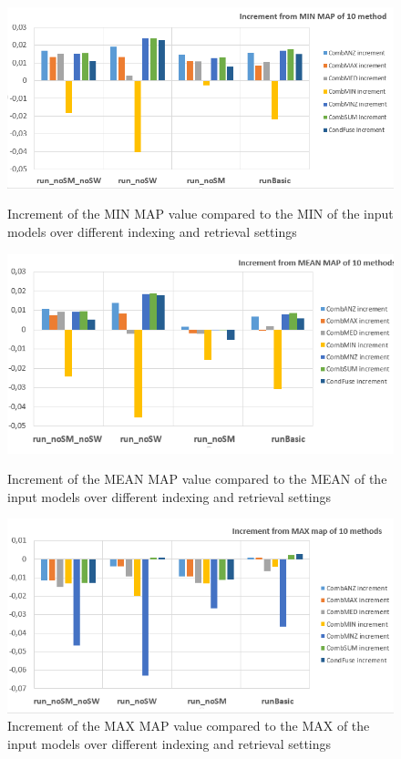 {	\begin{figure}	
		\begin{minipage}[H]{0.5\linewidth}
			\centering
			\includegraphics[width=\linewidth]{../eval/results-img-graphs/incrementFromMIN.png}
			\caption{Increment of the MIN MAP value compared to the MIN of the input models over different indexing and retrieval settings}				
			\label{fig:MINincr}
		\end{minipage}
		\begin{minipage}[H]{0.5\linewidth}
			\centering
			\includegraphics[width=\linewidth]{../eval/results-img-graphs/incrementFromMEAN.png}
			\caption{Increment of the MEAN MAP value compared to the MEAN of the input models over different indexing and retrieval settings}				
			\label{fig:MEANincr}
		\end{minipage}
		\begin{minipage}[H]{0.5\linewidth}
			\centering
			\includegraphics[width=\linewidth]{../eval/results-img-graphs/incrementFromMAX.png}
			\caption{Increment of the MAX MAP value compared to the MAX of the input models over different indexing and retrieval settings}				
			\label{fig:MAXincr}
		\end{minipage}
	\end{figure}
	
}
